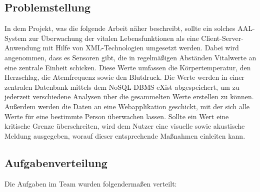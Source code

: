 \subsection{Problemstellung}
\label{subsec:Problemstellung}
In dem Projekt, was die folgende Arbeit näher beschreibt, sollte ein solches AAL-System zur Überwachung der vitalen Lebensfunktionen als eine Client-Server-Anwendung mit Hilfe von XML-Technologien umgesetzt werden. Dabei wird angenommen, dass es Sensoren gibt, die in regelmäßigen Abständen Vitalwerte an eine zentrale Einheit schicken. Diese Werte umfassen die Körpertemperatur, den Herzschlag, die Atemfrequenz sowie den Blutdruck. Die Werte werden in einer zentralen Datenbank mittels dem NoSQL-DBMS eXist abgespeichert, um zu jederzeit verschiedene Analysen über die gesammelten Werte erstellen zu können. Außerdem werden die Daten an eine Webapplikation geschickt, mit der sich alle Werte für eine bestimmte Person überwachen lassen. Sollte ein Wert eine kritische Grenze überschreiten, wird dem Nutzer eine visuelle sowie akustische Meldung ausgegeben, worauf dieser entsprechende Maßnahmen einleiten kann.

\newpage
\subsection{Aufgabenverteilung}
\label{subsec:Aufgabenverteilung}
Die Aufgaben im Team wurden folgendermaßen verteilt:

